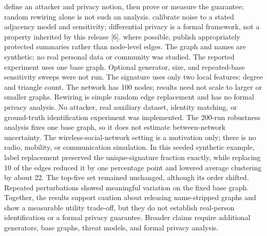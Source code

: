 \markdownRendererUlItem {} define an attacker and privacy notion, then prove or measure the guarantee; random rewiring alone is not such an analysis.\markdownRendererUlItemEnd 
\markdownRendererUlItem {} calibrate noise to a stated adjacency model and sensitivity; differential privacy is a formal framework, not a property inherited by this release [6].\markdownRendererUlItemEnd 
\markdownRendererUlItem {} where possible, publish appropriately protected summaries rather than node-level edges.\markdownRendererUlItemEnd 
\markdownRendererUlEndTight \markdownRendererInterblockSeparator
{}
\markdownRendererSectionEnd 
\markdownRendererSectionEnd \markdownRendererSectionBegin
{}\markdownRendererInterblockSeparator
{}\markdownRendererUlBeginTight
\markdownRendererUlItem The graph and names are synthetic; no real personal data or community was studied.\markdownRendererUlItemEnd 
\markdownRendererUlItem The reported experiment uses one  base graph. Optional generator, size, and repeated-base sensitivity sweeps were not run.\markdownRendererUlItemEnd 
\markdownRendererUlItem The signature uses only two local features: degree and triangle count.\markdownRendererUlItemEnd 
\markdownRendererUlItem The network has 100 nodes; results need not scale to larger or smaller graphs.\markdownRendererUlItemEnd 
\markdownRendererUlItem Rewiring is simple random edge replacement and has no formal privacy analysis.\markdownRendererUlItemEnd 
\markdownRendererUlItem No attacker, real auxiliary dataset, identity matching, or ground-truth identification experiment was implemented.\markdownRendererUlItemEnd 
\markdownRendererUlItem The 200-run robustness analysis fixes one base graph, so it does not estimate between-network uncertainty.\markdownRendererUlItemEnd 
\markdownRendererUlItem The wireless-social-network setting is a motivation only; there is no radio, mobility, or communication simulation.\markdownRendererUlItemEnd 
\markdownRendererUlEndTight \markdownRendererInterblockSeparator
{}
\markdownRendererSectionEnd \markdownRendererSectionBegin
{}\markdownRendererInterblockSeparator
{}In this seeded synthetic example, label replacement preserved the unique-signature fraction exactly, while replacing 10\markdownRendererPercentSign{} of the edges reduced it by one percentage point and lowered average clustering by about 22\markdownRendererPercentSign{}. The top-five set remained unchanged, although its order shifted. Repeated perturbations showed meaningful variation on the fixed base graph. Together, the results support caution about releasing name-stripped graphs and show a measurable utility trade-off, but they do not establish real-person identification or a formal privacy guarantee. Broader claims require additional generators, base graphs, threat models, and formal privacy analysis.\markdownRendererInterblockSeparator
